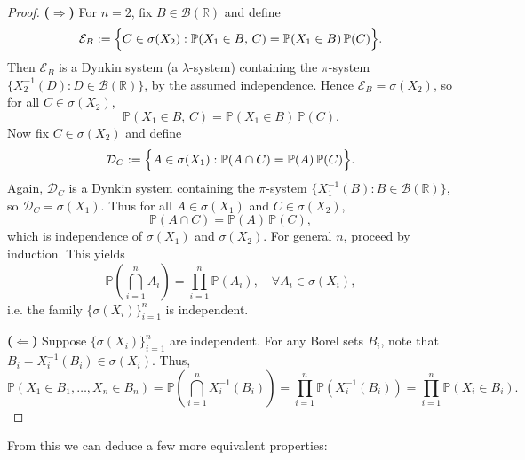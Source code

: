 \documentclass[11pt,a4paper]{article}
\theoremstyle{definition}
\begin{document}
\begin{proof}
    \textbf{($\Rightarrow$)} For $n=2$, fix $B \in \mathcal{B}(\mathbb{R})$ and define
\[
\mathcal{E}_B := \Bigl\{ C \in \sigma(X_2) : \mathbb{P}(X_1 \in B,\, C) 
= \mathbb{P}(X_1 \in B)\,\mathbb{P}(C) \Bigr\}.
\]
Then $\mathcal{E}_B$ is a Dynkin system (a $\lambda$-system) containing the $\pi$-system 
$\{X_2^{-1}(D) : D \in \mathcal{B}(\mathbb{R})\}$, by the assumed independence.  
Hence $\mathcal{E}_B = \sigma(X_2)$, so for all $C \in \sigma(X_2)$,
\[
\mathbb{P}(X_1 \in B,\, C) = \mathbb{P}(X_1 \in B)\,\mathbb{P}(C).
\]
\noindent
Now fix $C \in \sigma(X_2)$ and define
\[
\mathcal{D}_C := \Bigl\{ A \in \sigma(X_1) : \mathbb{P}(A \cap C) = \mathbb{P}(A)\,\mathbb{P}(C) \Bigr\}.
\]
Again, $\mathcal{D}_C$ is a Dynkin system containing the $\pi$-system 
$\{X_1^{-1}(B): B \in \mathcal{B}(\mathbb{R})\}$, so $\mathcal{D}_C=\sigma(X_1)$.  
Thus for all $A \in \sigma(X_1)$ and $C \in \sigma(X_2)$,
\[
\mathbb{P}(A \cap C) = \mathbb{P}(A)\,\mathbb{P}(C),
\]
which is independence of $\sigma(X_1)$ and $\sigma(X_2)$.
\noindent
For general $n$, proceed by induction. This yields
\[
\mathbb{P}\!\left(\bigcap_{i=1}^n A_i\right) = \prod_{i=1}^n \mathbb{P}(A_i),
\quad \forall A_i \in \sigma(X_i),
\]
i.e. the family $\{\sigma(X_i)\}_{i=1}^n$ is independent.

\medskip
\noindent
\textbf{($\Leftarrow$)}  
Suppose $\{\sigma(X_i)\}_{i=1}^n$ are independent.  
For any Borel sets $B_i$, note that $B_i = X_i^{-1}(B_i) \in \sigma(X_i)$.  
Thus,
\[
\mathbb{P}(X_1 \in B_1, \dots, X_n \in B_n)
= \mathbb{P}\!\left( \bigcap_{i=1}^n X_i^{-1}(B_i) \right)
= \prod_{i=1}^n \mathbb{P}(X_i^{-1}(B_i))
= \prod_{i=1}^n \mathbb{P}(X_i \in B_i).
\]
\end{proof}
\noindent From this we can deduce a few more equivalent properties:
\end{document}
